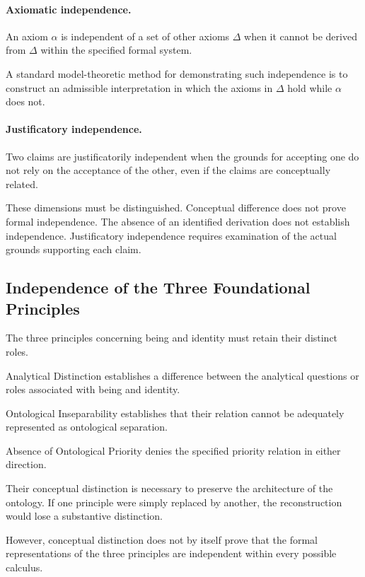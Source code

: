 \paragraph{Axiomatic independence.}

An axiom \(\alpha\) is independent of a set of other axioms
\(\Delta\) when it cannot be derived from \(\Delta\) within
the specified formal system.

A standard model-theoretic method for demonstrating such
independence is to construct an admissible interpretation
in which the axioms in \(\Delta\) hold while \(\alpha\)
does not.

\paragraph{Justificatory independence.}

Two claims are justificatorily independent when the grounds
for accepting one do not rely on the acceptance of the
other, even if the claims are conceptually related.

These dimensions must be distinguished. Conceptual difference
does not prove formal independence. The absence of an
identified derivation does not establish independence.
Justificatory independence requires examination of the
actual grounds supporting each claim.

\subsection{Independence of the Three Foundational Principles}

The three principles concerning being and identity must
retain their distinct roles.

Analytical Distinction establishes a difference between
the analytical questions or roles associated with being
and identity.

Ontological Inseparability establishes that their relation
cannot be adequately represented as ontological separation.

Absence of Ontological Priority denies the specified
priority relation in either direction.

Their conceptual distinction is necessary to preserve
the architecture of the ontology. If one principle were
simply replaced by another, the reconstruction would lose
a substantive distinction.

However, conceptual distinction does not by itself prove
that the formal representations of the three principles
are independent within every possible calculus.

